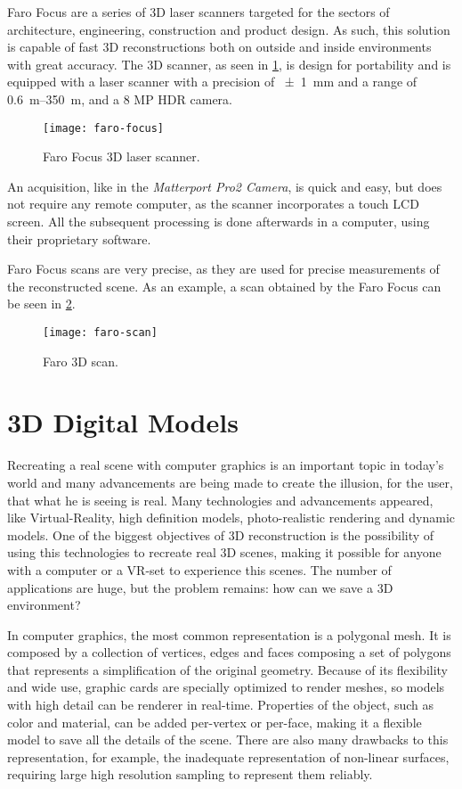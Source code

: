 Faro Focus \cite{faro-focus} are a series of 3D laser scanners targeted for the sectors of architecture, engineering, construction and product design. As such, this solution is capable of fast 3D reconstructions both on outside and inside environments with great accuracy. The 3D scanner, as seen in \cref{fig:faro-focus}, is design for portability and is equipped with a laser scanner with a precision of \SI{+-1}{\milli\meter} and a range of \SIrange{0.6}{350}{\meter}, and a 8 MP HDR camera.

\begin{figure}[h]
    \centering
    \texttt{[image: faro-focus]}
    \caption{Faro Focus 3D laser scanner.}
    \label{fig:faro-focus}
\end{figure}

An acquisition, like in the \emph{Matterport Pro2 Camera}, is quick and easy, but does not require any remote computer, as the scanner incorporates a touch LCD screen. All the subsequent processing is done afterwards in a computer, using their proprietary software.

Faro Focus scans are very precise, as they are used for precise measurements of the reconstructed scene. As an example, a scan obtained by the Faro Focus can be seen in \cref{fig:faro-scan}.

\begin{figure}[h]
    \centering
    \texttt{[image: faro-scan]}
    \caption{Faro 3D scan.}
    \label{fig:faro-scan}
    
\end{figure}

\section{3D Digital Models}

Recreating a real scene with computer graphics is an important topic in today's world and many advancements are being made to create the illusion, for the user, that what he is seeing is real. Many technologies and advancements appeared, like Virtual-Reality, high definition models, photo-realistic rendering and dynamic models. One of the biggest objectives of 3D reconstruction is the possibility of using this technologies to recreate real 3D scenes, making it possible for anyone with a computer or a VR-set to experience this scenes. The number of applications are huge, but the problem remains: how can we save a 3D environment?

In computer graphics, the most common representation is a polygonal mesh. It is composed by a collection of vertices, edges and faces composing a set of polygons that represents a simplification of the original geometry. Because of its flexibility and wide use, graphic cards are specially optimized to render meshes, so models with high detail can be renderer in real-time. Properties of the object, such as color and material, can be added per-vertex or per-face, making it a flexible model to save all the details of the scene. There are also many drawbacks to this representation, for example, the inadequate representation of non-linear surfaces, requiring large high resolution sampling to represent them reliably.


